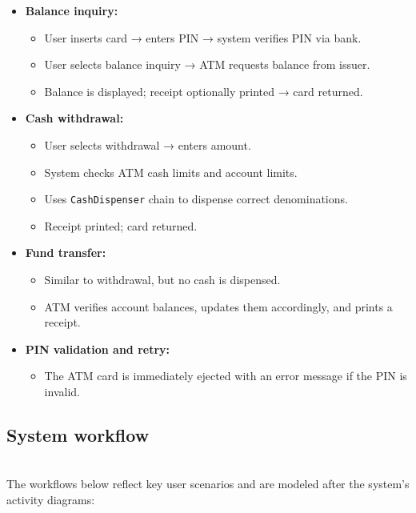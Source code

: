 \begin{itemize}
\item
\protect{}\label{TgBtAw-3IjKDBbcYXtMiV}
\textbf{Balance inquiry:}

\begin{itemize}
\item
User inserts card → enters PIN → system verifies PIN via bank.
\item
User selects balance inquiry → ATM requests balance from issuer.
\item
Balance is displayed; receipt optionally printed → card returned.
\end{itemize}
\item
\protect{}\label{DpPNMeS3Fu7zI56fY5iT_}
\textbf{Cash withdrawal:}

\begin{itemize}
\item
User selects withdrawal → enters amount.
\item
System checks ATM cash limits and account limits.
\item
Uses \texttt{CashDispenser} chain to dispense correct denominations.
\item
Receipt printed; card returned.
\end{itemize}
\item
\protect{}\label{hWRQYHKknDs1LserTwri4}
\textbf{Fund transfer:}

\begin{itemize}
\item
Similar to withdrawal, but no cash is dispensed.
\item
ATM verifies account balances, updates them accordingly, and prints a receipt.
\end{itemize}
\item
\protect{}\label{PBUPMMmdMUXNaIDrY9k7G}
\textbf{PIN validation and retry:}

\begin{itemize}
\item
The ATM card is immediately ejected with an error message if the PIN is invalid.
\end{itemize}
\end{itemize}

\subsection{System workflow}\label{0iTgUQw8A55fI5AIXfL13}
\\
The workflows below reflect key user scenarios and are modeled after the system's activity diagrams:

